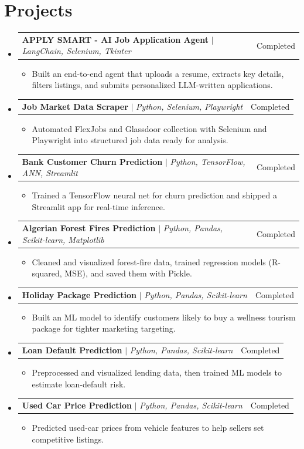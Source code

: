 \documentclass[letterpaper,10pt]{article}
\makeatletter
\newcommand{\resumeItem}[1]{
  \item\small{
    {#1 \vspace{-2pt}}
  }
}
\newcommand{\resumeProjectHeading}[2]{
    \item
    \begin{tabular*}{0.97\textwidth}{l@{\extracolsep{\fill}}r}
      \small#1 & #2 \\
    \end{tabular*}\vspace{-7pt}
}
\newcommand{\resumeSubHeadingListStart}{\begin{itemize}[leftmargin=0.15in, label={}]}
\newcommand{\resumeSubHeadingListEnd}{\end{itemize}}
\newcommand{\resumeItemListStart}{\begin{itemize}}
\newcommand{\resumeItemListEnd}{\end{itemize}\vspace{-5pt}}
\makeatother
\begin{document}
\section{Projects}
  \resumeSubHeadingListStart
    \resumeProjectHeading
      {\textbf{APPLY SMART - AI Job Application Agent} $|$ \emph{LangChain, Selenium, Tkinter}}{Completed}
      \resumeItemListStart
        \resumeItem{Built an end-to-end agent that uploads a resume, extracts key details, filters listings, and submits personalized LLM-written applications.}
      \resumeItemListEnd
    \resumeProjectHeading
      {\textbf{Job Market Data Scraper} $|$ \emph{Python, Selenium, Playwright}}{Completed}
      \resumeItemListStart
        \resumeItem{Automated FlexJobs and Glassdoor collection with Selenium and Playwright into structured job data ready for analysis.}
      \resumeItemListEnd
    \resumeProjectHeading
      {\textbf{Bank Customer Churn Prediction} $|$ \emph{Python, TensorFlow, ANN, Streamlit}}{Completed}
      \resumeItemListStart
        \resumeItem{Trained a TensorFlow neural net for churn prediction and shipped a Streamlit app for real-time inference.}
      \resumeItemListEnd
    \resumeProjectHeading
      {\textbf{Algerian Forest Fires Prediction} $|$ \emph{Python, Pandas, Scikit-learn, Matplotlib}}{Completed}
      \resumeItemListStart
        \resumeItem{Cleaned and visualized forest-fire data, trained regression models (R-squared, MSE), and saved them with Pickle.}
      \resumeItemListEnd
    \resumeProjectHeading
      {\textbf{Holiday Package Prediction} $|$ \emph{Python, Pandas, Scikit-learn}}{Completed}
      \resumeItemListStart
        \resumeItem{Built an ML model to identify customers likely to buy a wellness tourism package for tighter marketing targeting.}
      \resumeItemListEnd
    \resumeProjectHeading
      {\textbf{Loan Default Prediction} $|$ \emph{Python, Pandas, Scikit-learn}}{Completed}
      \resumeItemListStart
        \resumeItem{Preprocessed and visualized lending data, then trained ML models to estimate loan-default risk.}
      \resumeItemListEnd
    \resumeProjectHeading
      {\textbf{Used Car Price Prediction} $|$ \emph{Python, Pandas, Scikit-learn}}{Completed}
      \resumeItemListStart
        \resumeItem{Predicted used-car prices from vehicle features to help sellers set competitive listings.}
      \resumeItemListEnd
  \resumeSubHeadingListEnd

\end{document}
